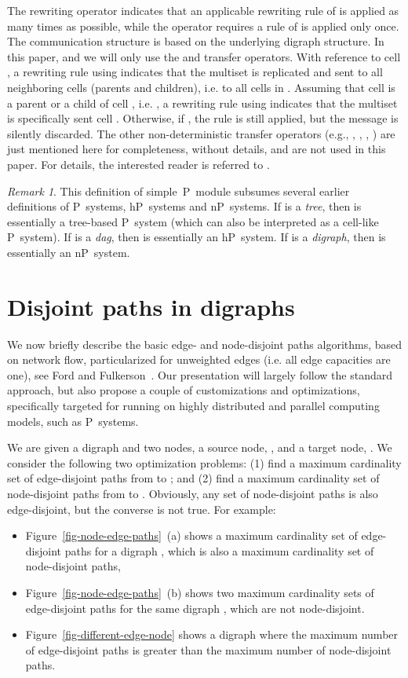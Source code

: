 \documentclass[preliminary,copyright,creativecommons]{eptcs}
\theoremstyle{remark}
\newtheorem{remark}[theorem]{Remark}
\begin{document}
The rewriting operator 
indicates that an applicable rewriting rule of  is applied as many times as
possible, while the operator  requires a rule of  is 
applied only once.
The communication structure is based on the underlying digraph structure.  
In this paper, and we will only use the  
and   transfer operators.
With reference to cell , 
a rewriting rule using  indicates
that the multiset  is replicated and sent to all neighboring cells
(parents and children), i.e. to all cells in . 
Assuming that cell  is a parent or a child of cell , 
i.e. ,
a rewriting rule using 
indicates that the multiset  is specifically sent cell .
Otherwise, if ,
the rule is still applied, but the message  is silently discarded.
The other non-deterministic transfer operators (e.g., , ,
, ) are just mentioned here for completeness,
without details, and are not used in this paper.
For details, the interested reader is referred to \cite{DKN-JLAP2010}.

\begin{remark}
This definition of simple~P~module subsumes several earlier definitions of P~systems, hP~systems and nP~systems.
If  is a \emph{tree}, then  is essentially a tree-based P~system 
(which can also be interpreted as a cell-like P~system).
If  is a \emph{dag}, then  is essentially an hP~system.
If  is a \emph{digraph}, then  is essentially an nP~system.
\end{remark}


\section{Disjoint paths in digraphs}
\label{sec-disjoint-paths}

We now briefly describe the basic edge- and node-disjoint paths algorithms, 
based on network flow, particularized for unweighted edges 
(i.e. all edge capacities are one), see Ford and Fulkerson~\cite{FordF1956}.
Our presentation will largely follow the standard approach, but also 
propose a couple of customizations and optimizations, specifically targeted for  
running on highly distributed and parallel computing models,
such as P~systems.

We are given a digraph  and two nodes, 
a source node, , and a target node, .
We consider the following two optimization problems:
(1) find a maximum cardinality set of edge-disjoint paths from  to ; and
(2) find a maximum cardinality set of node-disjoint paths from  to .
Obviously, any set of node-disjoint paths is also edge-disjoint,
but the converse is not true.
For example: 
\begin{itemize}
\item Figure~\ref{fig-node-edge-paths}~(a) 
shows a maximum cardinality set of edge-disjoint paths for a digraph ,
which is also a maximum cardinality set of node-disjoint paths,
\item Figure~\ref{fig-node-edge-paths}~(b) 
shows two maximum cardinality sets of edge-disjoint paths for the same digraph ,
which are not node-disjoint.
\item Figure~\ref{fig-different-edge-node} shows a digraph where 
the maximum number of edge-disjoint paths
is greater than the maximum number of node-disjoint paths.
\end{itemize}
\end{document}
